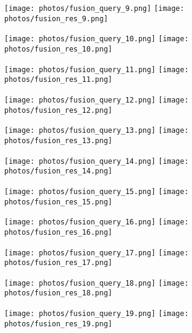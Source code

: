 \documentclass{article}
\begin{document}
\begin{figure}[!ht]
  \centering
  \texttt{[image: photos/fusion\_query\_9.png]}
  \texttt{[image: photos/fusion\_res\_9.png]}
\end{figure}

\begin{figure}[!ht]
  \centering
  \texttt{[image: photos/fusion\_query\_10.png]}
  \texttt{[image: photos/fusion\_res\_10.png]}
\end{figure}

\begin{figure}[!ht]
  \centering
  \texttt{[image: photos/fusion\_query\_11.png]}
  \texttt{[image: photos/fusion\_res\_11.png]}
\end{figure}

\begin{figure}[!ht]
  \centering
  \texttt{[image: photos/fusion\_query\_12.png]}
  \texttt{[image: photos/fusion\_res\_12.png]}
\end{figure}

\begin{figure}[!ht]
  \centering
  \texttt{[image: photos/fusion\_query\_13.png]}
  \texttt{[image: photos/fusion\_res\_13.png]}
\end{figure}

\begin{figure}[!ht]
  \centering
  \texttt{[image: photos/fusion\_query\_14.png]}
  \texttt{[image: photos/fusion\_res\_14.png]}
\end{figure}

\begin{figure}[!ht]
  \centering
  \texttt{[image: photos/fusion\_query\_15.png]}
  \texttt{[image: photos/fusion\_res\_15.png]}
\end{figure}

\begin{figure}[!ht]
  \centering
  \texttt{[image: photos/fusion\_query\_16.png]}
  \texttt{[image: photos/fusion\_res\_16.png]}
\end{figure}

\begin{figure}[!ht]
  \centering
  \texttt{[image: photos/fusion\_query\_17.png]}
  \texttt{[image: photos/fusion\_res\_17.png]}
\end{figure}

\begin{figure}[!ht]
  \centering
  \texttt{[image: photos/fusion\_query\_18.png]}
  \texttt{[image: photos/fusion\_res\_18.png]}
\end{figure}

\begin{figure}[!ht]
  \centering
  \texttt{[image: photos/fusion\_query\_19.png]}
  \texttt{[image: photos/fusion\_res\_19.png]}
\end{figure}
\end{document}
